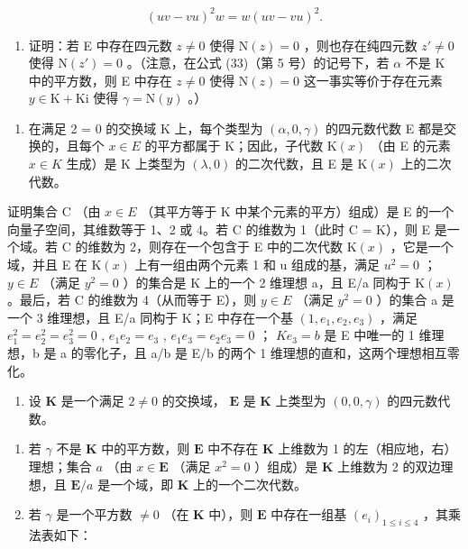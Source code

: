\[
(u v - v u) ^ {2} w = w (u v - v u) ^ {2}.
\]

\begin{enumerate}
\def\labelenumi{(\alph{enumi})}
\setcounter{enumi}{4}
\tightlist
\item
  证明：若 E 中存在四元数 \(z \neq 0\) 使得 \(\mathrm{N}(z) = 0\) ，则也存在纯四元数 \(z' \neq 0\) 使得 \(\mathrm{N}(z') = 0\) 。（注意，在公式 (33)（第 5 号）的记号下，若 \(\alpha\) 不是 K 中的平方数，则 E 中存在 \(z \neq 0\) 使得 \(\mathrm{N}(z) = 0\) 这一事实等价于存在元素 \(y \in \mathrm{K} + \mathrm{Ki}\) 使得 \(\gamma = \mathrm{N}(y)\) 。）
\end{enumerate}

\begin{enumerate}
\def\labelenumi{\arabic{enumi}.}
\setcounter{enumi}{4}
\tightlist
\item
  在满足 2 = 0 的交换域 K 上，每个类型为 \((\alpha, 0, \gamma)\) 的四元数代数 E 都是交换的，且每个 \(x \in E\) 的平方都属于 K；因此，子代数 \(\mathrm{K}(x)\) （由 E 的元素 \(x \in K\) 生成）是 K 上类型为 \((\lambda, 0)\) 的二次代数，且 E 是 \(\mathrm{K}(x)\) 上的二次代数。
\end{enumerate}

证明集合 C （由 \(x \in E\) （其平方等于 K 中某个元素的平方）组成）是 E 的一个向量子空间，其维数等于 1、2 或 4。若 C 的维数为 1（此时 C = K），则 E 是一个域。若 C 的维数为 2，则存在一个包含于 E 中的二次代数 \(\mathrm{K}(x)\) ，它是一个域，并且 E 在 \(\mathrm{K}(x)\) 上有一组由两个元素 1 和 u 组成的基，满足 \(u^{2} = 0\) ； \(y \in E\) （满足 \(y^{2} = 0\) ）的集合是 K 上的一个 2 维理想 a，且 E/a 同构于 \(\mathrm{K}(x)\) 。最后，若 C 的维数为 4（从而等于 E），则 \(y \in E\) （满足 \(y^{2} = 0\) ）的集合 a 是一个 3 维理想，且 E/a 同构于 K；E 中存在一个基 \((1, e_{1}, e_{2}, e_{3})\) ，满足 \(e_{1}^{2} = e_{2}^{2} = e_{3}^{2} = 0\) , \(e_{1}e_{2} = e_{3}\) , \(e_{1}e_{3} = e_{2}e_{3} = 0\) ； \(Ke_{3} = b\) 是 E 中唯一的 1 维理想，b 是 a 的零化子，且 a/b 是 E/b 的两个 1 维理想的直和，这两个理想相互零化。

\begin{enumerate}
\def\labelenumi{\arabic{enumi}.}
\setcounter{enumi}{5}
\tightlist
\item
  设 \(\mathbf{K}\) 是一个满足 \(2 \neq 0\) 的交换域， \(\mathbf{E}\) 是 \(\mathbf{K}\) 上类型为 \((0, 0, \gamma)\) 的四元数代数。
\end{enumerate}

\begin{enumerate}
\def\labelenumi{(\alph{enumi})}
\item
  若 \(\gamma\) 不是 \(\mathbf{K}\) 中的平方数，则 \(\mathbf{E}\) 中不存在 \(\mathbf{K}\) 上维数为 1 的左（相应地，右）理想；集合 \(a\) （由 \(x \in \mathbf{E}\) （满足 \(x^2 = 0\) ）组成）是 \(\mathbf{K}\) 上维数为 2 的双边理想，且 \(\mathbf{E} / a\) 是一个域，即 \(\mathbf{K}\) 上的一个二次代数。
\item
  若 \(\gamma\) 是一个平方数 \(\neq 0\) （在 \(\mathbf{K}\) 中），则 \(\mathbf{E}\) 中存在一组基 \((e_i)_{1\leq i\leq 4}\) ，其乘法表如下：
\end{enumerate}

